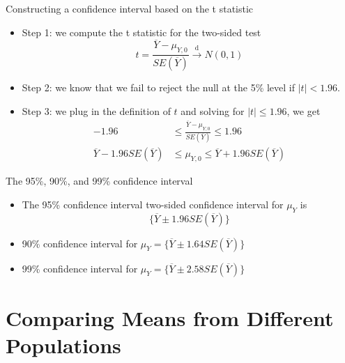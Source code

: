 \documentclass[presentation]{beamer}
\begin{document}
\begin{frame}[label={sec:orgd349ed7}]{Constructing a confidence interval based on the t statistic}
\begin{itemize}
\item Step 1: we compute the t statistic for the two-sided test
\[ t = \frac{\overline{Y} - \mu_{Y,0}}{SE(\overline{Y})}
   \xrightarrow{\text{ d }} N(0, 1) \]

\item Step 2: we know that we fail to reject the null at the 5\% level if \(|t| <
  1.96\).

\item Step 3: we plug in the definition of \(t\) and solving for \(|t| \leq 1.96\), we
get
\begin{align*}
-1.96 & \leq \frac{\overline{Y} - \mu_{Y,0}}{SE(\overline{Y})} \leq 1.96 \\
\overline{Y} - 1.96 SE(\overline{Y}) & \leq \mu_{Y,0} \leq \overline{Y} + 1.96 SE(\overline{Y})
\end{align*}
\end{itemize}
\end{frame}

\begin{frame}[label={sec:orgc9c6854}]{The 95\%, 90\%, and 99\% confidence interval}
\begin{itemize}
\item The 95\% confidence interval two-sided confidence interval for
\(\mu_Y\) is 
\[ \{ \overline{Y} \pm 1.96 SE(\overline{Y}) \} \]
\item 90\% confidence interval for \(\mu_Y = \{ \overline{Y} \pm 1.64
  SE(\overline{Y}) \}\)
\item 99\% confidence interval for \(\mu_Y = \{ \overline{Y} \pm 2.58
  SE(\overline{Y}) \}\)
\end{itemize}
\end{frame}


\section{Comparing Means from Different Populations}
\label{sec:org45a98f3}
\end{document}
